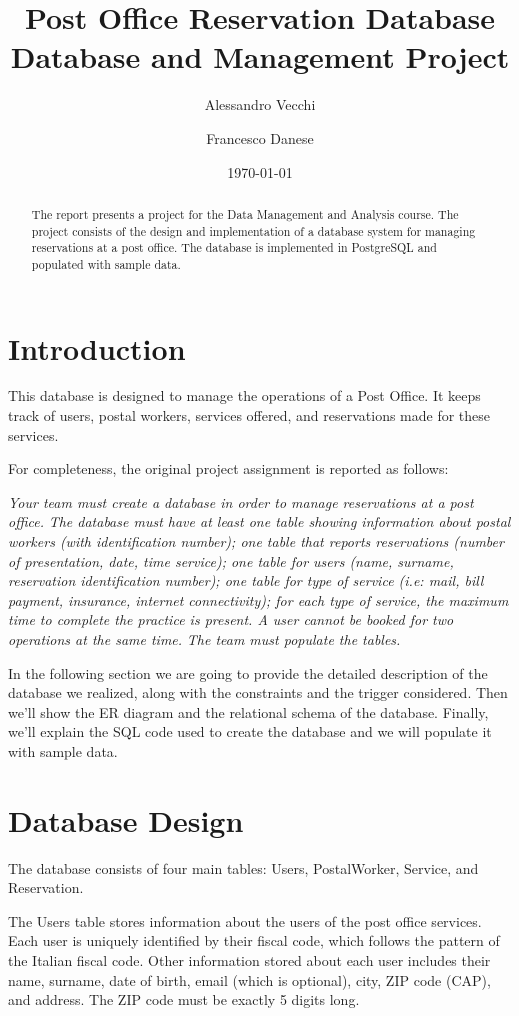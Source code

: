 \documentclass{article}
\title{Post Office Reservation Database \\ \large Database and Management Project}
\author{Alessandro Vecchi \and Francesco Danese}
\date{\today}
\begin{document}
\maketitle

\begin{abstract}
The report presents a project for the Data Management and Analysis course. The project consists of the design and implementation of a database system for managing reservations at a post office. The database is implemented in PostgreSQL and populated with sample data.
\end{abstract}

\section{Introduction}
This database is designed to manage the operations of a Post Office. It keeps track of users, postal workers, services offered, and reservations made for these services.

For completeness, the original project assignment is reported as follows: 

\textit{Your team must create a database in order to manage reservations at a post office.}
\textit{The database must have at least one table showing information about postal workers (with identification number); one table that reports reservations (number of presentation, date, time service); one table for users (name, surname, reservation identification number); one table for type of service (i.e: mail, bill payment, insurance, internet connectivity); for each type of service, the maximum time to complete the practice is present. A user cannot be booked for two operations at the same time.}
\textit{The team must populate the tables.}

In the following section we are going to provide the detailed description of the database we realized, along with the constraints and the trigger considered. Then we'll show the ER diagram and the relational schema of the database. Finally, we'll explain the SQL code used to create the database and we will populate it with sample data.
\section{Database Design}
The database consists of four main tables: Users, PostalWorker, Service, and Reservation.

The Users table stores information about the users of the post office services. Each user is uniquely identified by their fiscal code, which follows the pattern of the Italian fiscal code. Other information stored about each user includes their name, surname, date of birth, email (which is optional), city, ZIP code (CAP), and address. The ZIP code must be exactly 5 digits long.
\end{document}
